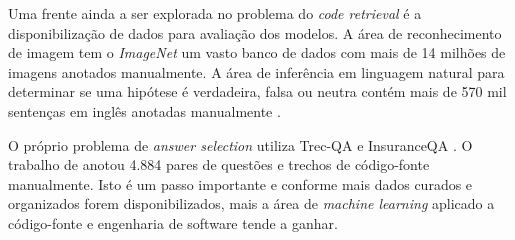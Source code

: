 \documentclass[12pt]{article}
\begin{document}
Uma frente ainda a ser explorada no problema do \textit{code retrieval} é a disponibilização de dados para avaliação dos modelos. A área de reconhecimento de imagem tem o \textit{ImageNet} \cite{imagenet_cvpr09} um vasto banco de dados com mais de 14 milhões de imagens anotados manualmente. A área de inferência em linguagem natural para determinar se uma hipótese é verdadeira, falsa ou neutra contém mais de 570 mil sentenças em inglês anotadas manualmente \cite{snli:emnlp2015}. 

O próprio problema de \textit{answer selection} utiliza Trec-QA \cite{wang-etal-2007-jeopardy} e InsuranceQA \cite{feng-answer-selection-2015}. O trabalho de \cite{Yao-staqc:2018} anotou 4.884 pares de questões e trechos de código-fonte manualmente. Isto é um passo importante e conforme mais dados curados e organizados forem disponibilizados, mais a área de \textit{machine learning} aplicado a código-fonte e engenharia de software tende a ganhar.







\end{document}
